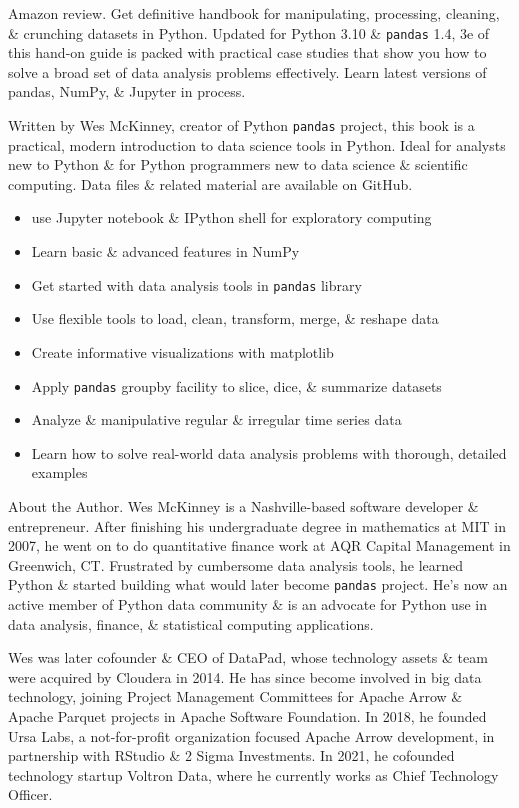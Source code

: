 \documentclass{article}
\begin{document}
{\sf Amazon review.} Get definitive handbook for manipulating, processing, cleaning, \& crunching datasets in Python. Updated for Python 3.10 \& {\tt pandas} 1.4, 3e of this hand-on guide is packed with practical case studies that show you how to solve a broad set of data analysis problems effectively. Learn latest versions of pandas, NumPy, \& Jupyter in process.

Written by {\sc Wes McKinney}, creator of Python {\tt pandas} project, this book is a practical, modern introduction to data science tools in Python. Ideal for analysts new to Python \& for Python programmers new to data science \& scientific computing. Data files \& related material are available on GitHub.
\begin{itemize}
	\item use Jupyter notebook \& IPython shell for exploratory computing
	\item Learn basic \& advanced features in NumPy
	\item Get started with data analysis tools in {\tt pandas} library
	\item Use flexible tools to load, clean, transform, merge, \& reshape data
	\item Create informative visualizations with matplotlib
	\item Apply {\tt pandas} groupby facility to slice, dice, \& summarize datasets
	\item Analyze \& manipulative regular \& irregular time series data
	\item Learn how to solve real-world data analysis problems with thorough, detailed examples
\end{itemize}
{\sf About the Author.} {\sc Wes McKinney} is a Nashville-based software developer \& entrepreneur. After finishing his undergraduate degree in mathematics at MIT in 2007, he went on to do quantitative finance work at AQR Capital Management in Greenwich, CT. Frustrated by cumbersome data analysis tools, he learned Python \& started building what would later become {\tt pandas} project. He's now an active member of Python data community \& is an advocate for Python use in data analysis, finance, \& statistical computing applications.

{\sc Wes} was later cofounder \& CEO of DataPad, whose technology assets \& team were acquired by Cloudera in 2014. He has since become involved in big data technology, joining Project Management Committees for Apache Arrow \& Apache Parquet projects in Apache Software Foundation. In 2018, he founded Ursa Labs, a not-for-profit organization focused Apache Arrow development, in partnership with RStudio \& 2 Sigma Investments. In 2021, he cofounded technology startup Voltron Data, where he currently works as Chief Technology Officer.
\end{document}
